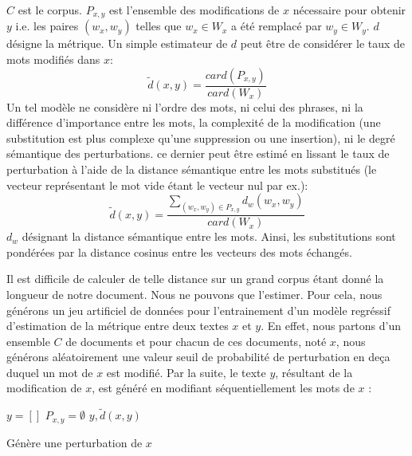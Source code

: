 $C$ est le corpus. $P_{x,y}$ est l'ensemble des modifications de $x$ nécessaire pour obtenir $y$ i.e. les paires $(w_x, w_y)$ telles que $w_x \in W_x$ a été remplacé par $w_y \in W_y$. $d$ désigne la métrique. Un simple estimateur de $d$ peut être de considérer le taux de mots modifiés dans $x$: 
\begin{equation}
\widetilde{d}(x,y) = \frac{card(P_{x,y})}{card(W_x)}
\end{equation}
 Un tel modèle ne considère ni l'ordre des mots, ni celui des phrases, ni la différence d'importance entre les mots, la complexité de la modification (une substitution est plus complexe qu'une suppression ou une insertion), ni le degré sémantique des perturbations. ce dernier peut être estimé en lissant le taux de perturbation à l'aide de la distance sémantique entre les mots substitués (le vecteur représentant le mot vide étant le vecteur nul par ex.):
\begin{equation}
\widetilde{d}(x,y) = \frac{\sum\limits_{(w_x, w_y) \in P_{x,y}} d_w(w_x,w_y)}{card(W_x)} \label{equation:similarite:somme-dist-mots}
\end{equation}
$d_w$ désignant la distance sémantique entre les mots. Ainsi, les substitutions sont pondérées par la distance cosinus entre les vecteurs des mots échangés.

Il est difficile de calculer de telle distance sur un grand corpus étant donné la longueur de notre document. 
Nous ne pouvons que l'estimer. Pour cela, nous générons un jeu artificiel de données pour l'entrainement d'un modèle regréssif d'estimation de la métrique entre deux textes $x$ et $y$. En effet, nous partons d'un ensemble $C$ de documents et pour chacun de ces documents, noté $x$, nous générons aléatoirement une valeur seuil de probabilité de perturbation en deça duquel un mot de $x$ est modifié. Par la suite, le texte  $y$, résultant de la modification de $x$, est généré en modifiant séquentiellement les mots de $x$ :

\begin{algorithm}[H] %
 $y = [] $\; 
 $P_{x,y} = \emptyset$\;
 \Return $y, \widetilde{d}(x,y)$\;
 \caption{Génère une perturbation de $x$} \label{algo:similarite:perturbation}
\end{algorithm}


